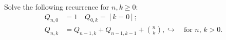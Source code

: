 \documentclass{article}
\begin{document}
Solve the following recurrence for $ n,k\geq 0 $: \begin{align*}
Q_{n,0} &= 1 \quad Q_{0,k} = [k=0]; \\ Q_{n,k} &= Q_{n-1,k}+Q_{n-1,k-1}+\binom{n}{k},
↪ \quad\text{for $n$, $k>0$.} \end{align*}
\end{document}
